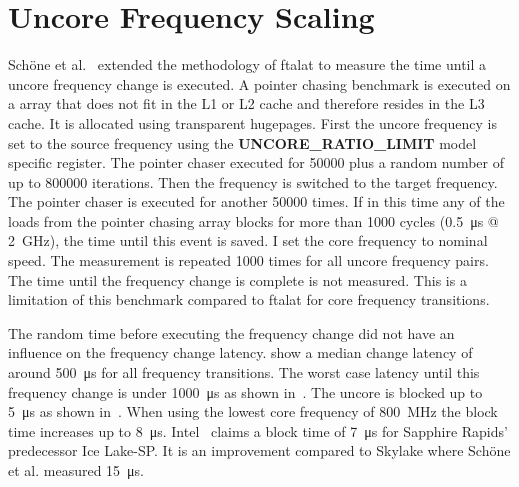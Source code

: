 \section{Uncore Frequency Scaling}
\label{sec:uncore_frequency_scaling}
Schöne et al.~\cite{Schoene_2019_SKL} extended the methodology of ftalat to measure the time until a uncore frequency change is executed.
A pointer chasing benchmark is executed on a array that does not fit in the L1 or L2 cache and therefore resides in the L3 cache.
It is allocated using transparent hugepages.
First the uncore frequency is set to the source frequency using the \textbf{UNCORE\_RATIO\_LIMIT} model specific register.
The pointer chaser executed for \SI{50000}{} plus a random number of up to \SI{800000}{} iterations.
Then the frequency is switched to the target frequency.
The pointer chaser is executed for another \SI{50000}{} times.
If in this time any of the loads from the pointer chasing array blocks for more than \SI{1000}{} cycles (\SI{0.5}{\us} @ \SI{2}{\GHz}), the time until this event is saved.
I set the core frequency to nominal speed.
The measurement is repeated \SI{1000}{} times for all uncore frequency pairs.
The time until the frequency change is complete is not measured.
This is a limitation of this benchmark compared to ftalat for core frequency transitions.

The random time before executing the frequency change did not have an influence on the frequency change latency.
 show a median change latency of around \SI{500}{\us} for all frequency transitions.
The worst case latency until this frequency change is under \SI{1000}{\us} as shown in~.
The uncore is blocked up to \SI{5}{\us} as shown in~.
When using the lowest core frequency of \SI{800}{\MHz} the block time increases up to \SI{8}{\us}.
Intel~\cite{Intel_2020_IceLake_SP} claims a block time of \SI{7}{\us} for Sapphire Rapids' predecessor Ice Lake-SP.
It is an improvement compared to Skylake where Schöne et al. measured \SI{15}{\us}.

